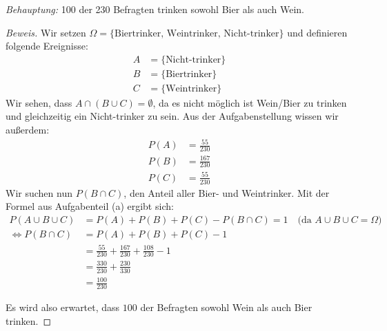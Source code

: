 \documentclass[10pt]{article}
\begin{document}
\textit{Behauptung: } 100 der 230 Befragten trinken sowohl Bier als auch Wein.
\begin{proof}[Beweis]
Wir setzen $\Omega = \{\text{Biertrinker, Weintrinker, Nicht-trinker}\}$ und definieren folgende Ereignisse: 
\begin{align*}
    A &= \{\text{Nicht-trinker}\} \\
    B &= \{\text{Biertrinker}\} \\
    C &= \{\text{Weintrinker}\}
\end{align*}
Wir sehen, dass $A \cap (B \cup C) = \emptyset$, da es nicht möglich ist Wein/Bier zu trinken und gleichzeitig ein Nicht-trinker zu sein.
Aus der Aufgabenstellung wissen wir außerdem:
\begin{align*}
    P(A) &= \frac{55}{230} \\
    P(B) &= \frac{167}{230} \\
    P(C) &= \frac{55}{230}
\end{align*}
Wir suchen nun $P(B\cap C)$, den Anteil aller Bier- und Weintrinker. Mit der Formel aus Aufgabenteil (a) ergibt sich:
\begin{align*}
P(A \cup B \cup C) &= P(A) + P(B) + P(C) - P(B \cap C) = 1 \quad\text{(da $A\cup B\cup C = \Omega$)} \\
\Leftrightarrow P(B \cap C) &= P(A) + P(B) + P(C) - 1 \\
&= \frac{55}{230} + \frac{167}{230} + \frac{108}{230} - 1 \\
&= \frac{330}{230} + \frac{230}{330} \\
&= \frac{100}{230}
\end{align*}

Es wird also erwartet, dass $100$ der Befragten sowohl Wein als auch Bier trinken.

\end{proof}
\end{document}
